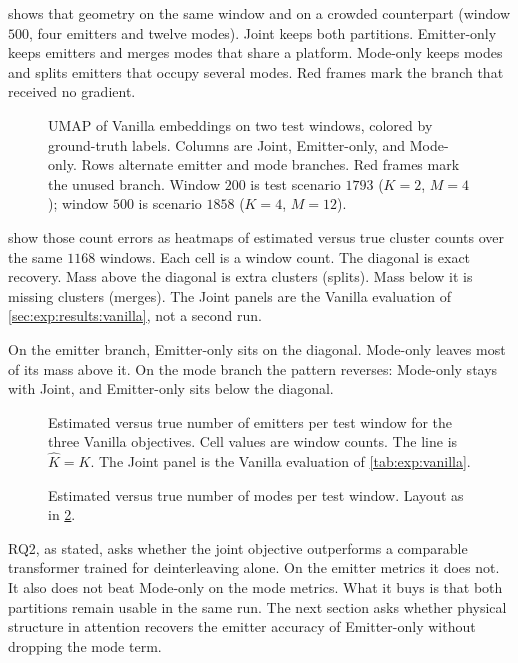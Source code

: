  shows that geometry on the same window and on a crowded counterpart (window $500$, four emitters and twelve modes).
Joint keeps both partitions.
Emitter-only keeps emitters and merges modes that share a platform.
Mode-only keeps modes and splits emitters that occupy several modes.
Red frames mark the branch that received no gradient.

\begin{figure}[tbp]
  \centering
  \caption{UMAP of Vanilla embeddings on two test windows, colored by ground-truth labels. Columns are Joint, Emitter-only, and Mode-only. Rows alternate emitter and mode branches. Red frames mark the unused branch. Window $200$ is test scenario $1793$ ($K=2$, $M=4$); window $500$ is scenario $1858$ ($K=4$, $M=12$).}
  \label{fig:exp:emb_ablation}
\end{figure}

 show those count errors as heatmaps of estimated versus true cluster counts over the same $1168$ windows.
Each cell is a window count.
The diagonal is exact recovery.
Mass above the diagonal is extra clusters (splits).
Mass below it is missing clusters (merges).
The Joint panels are the Vanilla evaluation of \cref{sec:exp:results:vanilla}, not a second run.

On the emitter branch, Emitter-only sits on the diagonal.
Mode-only leaves most of its mass above it.
On the mode branch the pattern reverses: Mode-only stays with Joint, and Emitter-only sits below the diagonal.

\begin{figure}[tbp]
  \centering
  \caption{Estimated versus true number of emitters per test window for the three Vanilla objectives. Cell values are window counts. The line is $\hat{K}=K$. The Joint panel is the Vanilla evaluation of \cref{tab:exp:vanilla}.}
  \label{fig:exp:kcorr_ablation_em}
\end{figure}

\begin{figure}[tbp]
  \centering
  \caption{Estimated versus true number of modes per test window. Layout as in \cref{fig:exp:kcorr_ablation_em}.}
  \label{fig:exp:kcorr_ablation_md}
\end{figure}

RQ2, as stated, asks whether the joint objective outperforms a comparable transformer trained for deinterleaving alone.
On the emitter metrics it does not.
It also does not beat Mode-only on the mode metrics.
What it buys is that both partitions remain usable in the same run.
The next section asks whether physical structure in attention recovers the emitter accuracy of Emitter-only without dropping the mode term.
